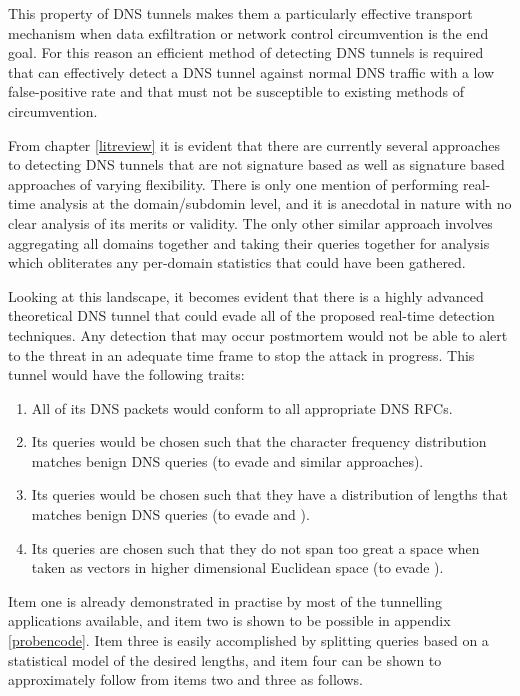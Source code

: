 \documentclass[12pt]{report}
\theoremstyle{remark}
\theoremstyle{definition}
\theoremstyle{definition}
\theoremstyle{definition}
\begin{document}
This property of DNS tunnels makes them a particularly effective transport
mechanism when data exfiltration or network control circumvention is the end
goal. For this reason an efficient method of detecting DNS tunnels is required
that can effectively detect a DNS tunnel against normal DNS traffic with a low
false-positive rate and that must not be susceptible to existing methods of
circumvention.

From chapter \ref{litreview} it is evident that there are currently several
approaches to detecting DNS tunnels that are not signature based as well as
signature based approaches of varying flexibility. There is only one mention of
performing real-time analysis at the domain/subdomin level, and it is anecdotal
in nature with no clear analysis of its merits or validity. The only other
similar approach involves aggregating all domains together and taking their
queries together for analysis which obliterates any per-domain statistics that
could have been gathered.

Looking at this landscape, it becomes evident that there is a highly advanced
theoretical DNS tunnel that could evade all of the proposed real-time detection
techniques. Any detection that may occur postmortem would not be able to alert
to the threat in an adequate time frame to stop the attack in progress. This
tunnel would have the following traits:

\label{supertunnel} \begin{enumerate} \item All of its DNS packets would conform
to all appropriate DNS RFCs. \item Its queries would be chosen such that the
character frequency distribution matches benign DNS queries (to evade
\cite{Born2010.cfa} and similar approaches). \item Its queries would be chosen
such that they have a distribution of lengths that matches benign DNS queries
(to evade \cite{Karasaridis2006} and \cite{SANS2013}). \item Its queries are
chosen such that they do not span too great a space when taken as vectors in
higher dimensional Euclidean space (to evade \cite{jhind2009}). \end{enumerate}

Item one is already demonstrated in practise by most of the tunnelling
applications available, and item two is shown to be possible in appendix
\ref{probencode}. Item three is easily accomplished by splitting queries based
on a statistical model of the desired lengths, and item four can be shown to
approximately follow from items two and three as follows.
\end{document}
